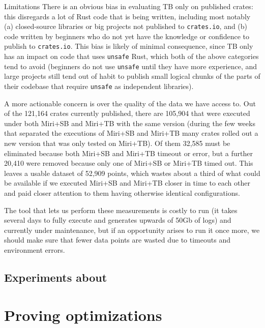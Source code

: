 \documentclass[a4paper,11pt]{article}
\theoremstyle{plain}
\theoremstyle{definition}
\theoremstyle{remark}
\newcommand{\tcode}[1]{\rstinline{#1}}
\begin{document}
\begin{paragraph}{Limitations}
    There is an obvious bias in evaluating TB only on published crates: this disregards a lot of
    Rust code that is being written, including most notably (a) closed-source libraries or big
    projects not published to \texttt{crates.io}, and (b) code written by beginners who do not
    yet have the knowledge or confidence to publish to \texttt{crates.io}.
    This bias is likely of minimal consequence, since TB only has an impact on code that uses
    \texttt{unsafe} Rust, which both of the above categories tend to avoid (beginners do
    not use \texttt{unsafe} until they have more experience, and large projects still tend out
    of habit to publish small logical chunks of the parts of their codebase that require \texttt{unsafe}
    as independent libraries).

    A more actionable concern is over the quality of the data we have access to.
    Out of the 121,164 crates currently published, there are 105,904 that were executed under both
    Miri+SB and Miri+TB with the same version (during the few weeks that separated the executions
    of Miri+SB and Miri+TB many crates rolled out a new version that was only tested on Miri+TB).
    Of them 32,585 must be eliminated because both Miri+SB and Miri+TB timeout or error,
    but a further 20,410 were removed because only one of Miri+SB or Miri+TB timed out.
    This leaves a usable dataset of 52,909 points, which wastes about a third of what could be
    available if we executed Miri+SB and Miri+TB closer in time to each other and paid closer
    attention to them having otherwise identical configurations.

    The tool that lets us perform these measurements is costly to run (it takes several days to
    fully execute and generates upwards of 50Gb of logs) and currently under maintenance,
    but if an opportunity arises to run it once more, we should make sure that fewer data points
    are wasted due to timeouts and environment errors.
\end{paragraph}

\subsection{Experiments about \tcode{Unique}}

\section{Proving optimizations}
\end{document}
